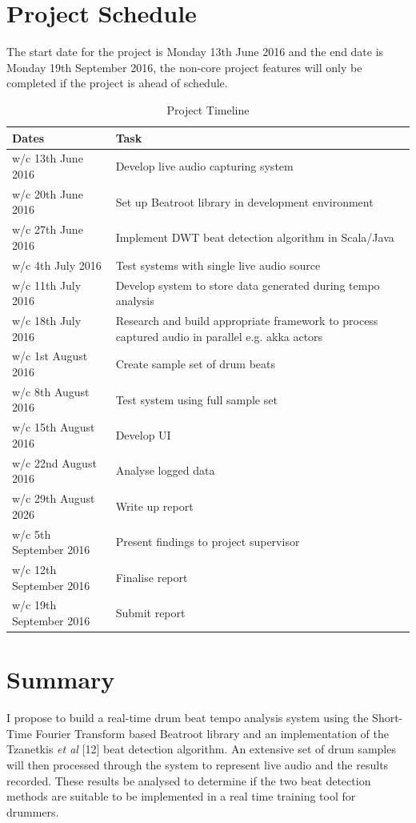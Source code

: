 \documentclass[a4paper, 11pt]{article}
\begin{document}
\section {Project Schedule}
The start date for the project is Monday 13th June 2016 and the end date is Monday 19th September 2016, the non-core project features will only be completed if the project is ahead of schedule.
\begin{table}[h]
\caption{Project Timeline} 
\centering
\begin{tabular}{|p{4cm}|p{8cm}|}
 \hline
\textbf{Dates} & \textbf{Task}\\ [0.5ex]
\hline 
w/c 13th June 2016 & Develop live audio capturing system\\
\hline 
w/c 20th June 2016 & Set up Beatroot library in development environment\\
\hline 
w/c 27th June 2016 & Implement DWT beat detection algorithm in Scala/Java\\
\hline 
w/c 4th July 2016 & Test systems with single live audio source\\
\hline 
w/c 11th July 2016 & Develop system to store data generated during tempo analysis\\
\hline 
w/c 18th July 2016 & Research and build appropriate framework to process captured audio in parallel e.g. akka actors\\
\hline 
w/c 1st August 2016 & Create sample set of drum beats\\
\hline 
w/c 8th August 2016 & Test system using full sample set\\
\hline 
w/c 15th August 2016 & Develop UI\\
\hline 
w/c 22nd August 2016 & Analyse logged data\\
\hline 
w/c 29th August 2026 & Write up report\\
\hline 
w/c 5th September 2016 & Present findings to project supervisor\\
\hline 
w/c 12th September 2016 & Finalise report\\
\hline 
w/c 19th September 2016 & Submit report\\
\hline
\end{tabular}
\end{table}
\clearpage
\maketitle{} 
\section{Summary}
I propose to build a real-time drum beat tempo analysis system using the Short-Time Fourier Transform based Beatroot library and an implementation of the Tzanetkis \textit{et al} [12] beat detection algorithm. An extensive set of drum samples will then processed through the system to represent live audio and the results recorded. These results be analysed to determine if the two beat detection methods are suitable to be implemented in a real time training tool for drummers.
\end{document}
